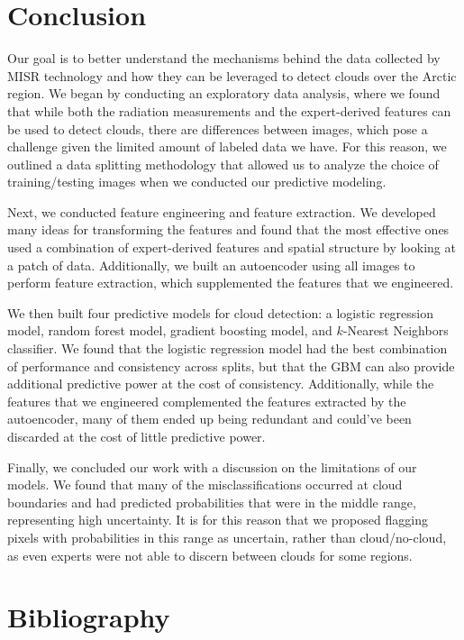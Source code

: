 \documentclass[11pt,letterpaper]{article}
\begin{document}
\section{Conclusion}
\label{sec:conclusion}

Our goal is to better understand the mechanisms behind the data collected by MISR technology and how they can be leveraged to detect clouds over the Arctic region. We began by conducting an exploratory data analysis, where we found that while both the radiation measurements and the expert-derived features can be used to detect clouds, there are differences between images, which pose a challenge given the limited amount of labeled data we have. For this reason, we outlined a data splitting methodology that allowed us to analyze the choice of training/testing images when we conducted our predictive modeling.

Next, we conducted feature engineering and feature extraction. We developed many ideas for transforming the features and found that the most effective ones used a combination of expert-derived features and spatial structure by looking at a patch of data. Additionally, we built an autoencoder using all images to perform feature extraction, which supplemented the features that we engineered.

We then built four predictive models for cloud detection: a logistic regression model, random forest model, gradient boosting model, and $k$-Nearest Neighbors classifier. We found that the logistic regression model had the best combination of performance and consistency across splits, but that the GBM can also provide additional predictive power at the cost of consistency. Additionally, while the features that we engineered complemented the features extracted by the autoencoder, many of them ended up being redundant and could've been discarded at the cost of little predictive power.

Finally, we concluded our work with a discussion on the limitations of our models. We found that many of the misclassifications occurred at cloud boundaries and had predicted probabilities that were in the middle range, representing high uncertainty. It is for this reason that we proposed flagging pixels with probabilities in this range as uncertain, rather than cloud/no-cloud, as even experts were not able to discern between clouds for some regions.



\newpage

\section{Bibliography}
\end{document}
